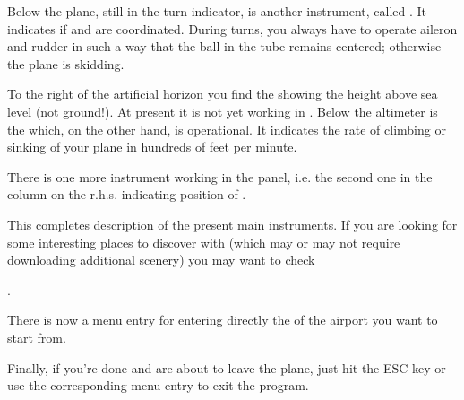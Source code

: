 Below the plane, still in the turn indicator, is another instrument, called
. It indicates if  and  are
coordinated. During turns, you always have to operate aileron and rudder in such a way
that the ball in the tube remains centered; otherwise the plane is skidding.

To the right of the artificial horizon you find the  showing the height
above sea level (not ground!). At present it is not yet working in
\FlightGear\hspace{-1mm}. Below the altimeter is the 
which, on the other hand, is operational. It indicates the rate of climbing or sinking of
your plane in hundreds of feet per minute.

There is one more instrument working in the panel, i.e. the second one in the column on
the r.h.s. indicating position of .

This completes description of the present main \FlightGear instruments. If you are
looking for some interesting places to discover with \FlightGear (which may or may not
require downloading additional scenery) you may want to check

 .

There is now a menu entry for entering directly the  of the airport
you want to start from.

Finally, if you're done and are about to leave the plane, just hit the ESC key or use the
corresponding menu entry to exit the program.

